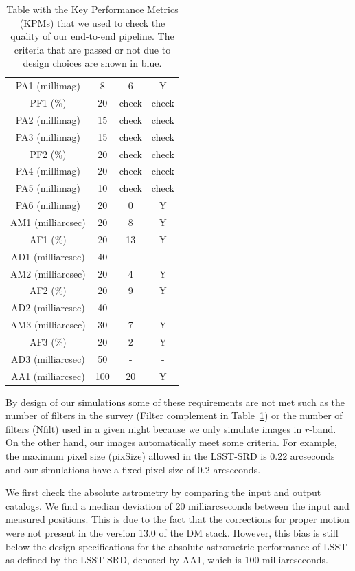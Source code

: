 \documentclass[twocolumn]{aastex62}
\begin{document}
\begin{table}[h]
\begin{tabular}{|c|c|c|c|}
PA1 (millimag) & 8 & 6 & Y\\
PF1 (\%) & 20 & check & check\\
PA2 (millimag) & 15 & check & check\\
PA3 (millimag) & 15 & check & check\\
PF2 (\%) & 20 & check & check\\
PA4 (millimag) & 20 & check & check\\
PA5 (millimag) & 10 & check & check\\
PA6 (millimag) & 20 & 0 & Y\\
AM1 (milliarcsec) & 20 & 8 & Y\\
AF1 (\%) & 20 & 13 & Y\\
AD1 (milliarcsec) & 40 & - & -\\
AM2 (milliarcsec) & 20 & 4 & Y\\
AF2 (\%) & 20 & 9 & Y\\
AD2 (milliarcsec) & 40 & - & -\\
AM3 (milliarcsec) & 30 & 7 & Y\\
AF3 (\%) & 20 & 2 & Y\\
AD3 (milliarcsec) & 50 & - & -\\
AA1 (milliarcsec) & 100 & 20 & Y\\
\hline
\end{tabular}
\caption{Table with the Key Performance Metrics (KPMs) that we used to check the quality of our end-to-end pipeline. The criteria that are passed or not due to design choices are shown in blue.}
\label{tab:kpm_table}
\end{table}

By design of our simulations some of these requirements are not met such as the number of filters in the survey (Filter complement in Table~\ref{tab:kpm_table}) or the number of filters (Nfilt) used in a given night because we only simulate images in $r$-band. On the other hand, our images automatically meet some criteria. For example, the maximum pixel size (pixSize) allowed in the LSST-SRD is 0.22 arcseconds and our simulations have a fixed pixel size of 0.2 arcseconds.

We first check the absolute astrometry by comparing the input and output catalogs. We find a median deviation of 20 milliarcseconds between the input and measured positions. This is due to the fact that the corrections for proper motion were not present in the version 13.0 of the DM stack. However, this bias is still below the design specifications for the absolute astrometric performance of LSST as defined by the LSST-SRD, denoted by AA1, which is 100 milliarcseconds. 
\end{document}
